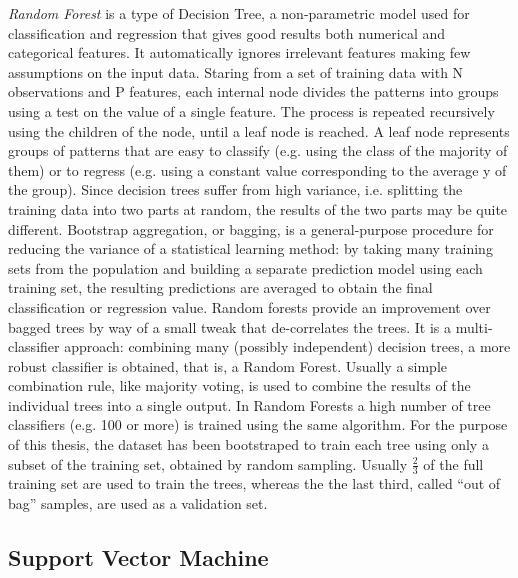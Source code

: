 \textit{Random Forest} is a type of Decision Tree, a non-parametric model used for classification and regression that gives good 
results both numerical and categorical features. It automatically ignores irrelevant features making few assumptions
on the input data. Staring from a set of training data with N observations and P features, each internal node divides the patterns into groups using a test on the value 
of a single feature. The process is repeated recursively using the children of the node, until a leaf node is reached. A leaf node represents groups of patterns that are easy to classify (e.g. using the class of the majority of 
them) or to regress (e.g. using a constant value corresponding to the average y of the group).
Since decision trees suffer from high variance, i.e. splitting the training data into two 
parts at random, the results of the two parts may be quite different. 
Bootstrap aggregation, or bagging, is a general-purpose procedure for reducing the 
variance of a statistical learning method: by taking many training sets from the population and building a separate 
prediction model using each training set, the resulting predictions are averaged to obtain the final classification or regression value.
Random forests provide an improvement over bagged trees by way of a small tweak that 
de-correlates the trees. It is a multi-classifier approach: combining many (possibly independent) 
decision trees, a more robust classifier is obtained, that is, a Random Forest. Usually a simple combination rule, like majority voting, is used to combine the results of the individual trees into a single output.
In Random Forests a high number of tree classifiers (e.g. 100 or more) is trained using the same 
algorithm. 
For the purpose of this thesis, the dataset has been bootstraped to train each tree using only a subset of the training set, obtained by random sampling.
Usually $\frac{2}{3}$ of the full training set are used to train the trees, whereas the the last third, called \enquote{out of bag} samples, are used as a validation set.


\subsection{Support Vector Machine}

